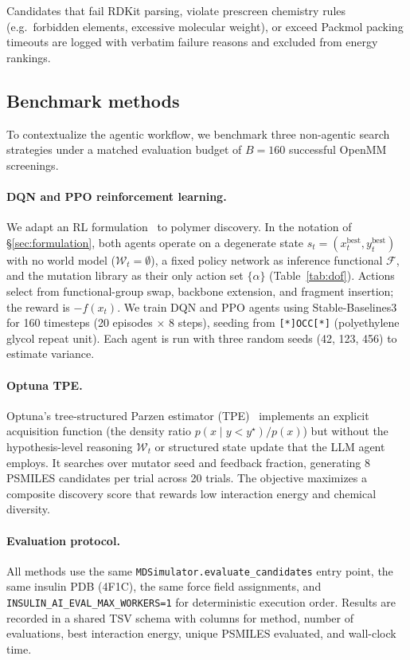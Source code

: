 \documentclass[twocolumn]{fairmeta}
\begin{document}
Candidates that fail RDKit parsing, violate prescreen chemistry rules (e.g.\ forbidden elements, excessive molecular weight), or exceed Packmol packing timeouts are logged with verbatim failure reasons and excluded from energy rankings.

\subsection{Benchmark methods}
\label{sec:benchmark_methods}

To contextualize the agentic workflow, we benchmark three non-agentic search strategies under a matched evaluation budget of $B{=}160$ successful OpenMM screenings.

\paragraph{DQN and PPO reinforcement learning.}
We adapt an RL formulation~\cite{boiko2023autonomous} to polymer discovery.
In the notation of \S\ref{sec:formulation}, both agents operate on a degenerate state $s_t = (x_t^\text{best}, y_t^\text{best})$ with no world model ($\mathcal{W}_t = \emptyset$), a fixed policy network as inference functional $\mathcal{F}$, and the mutation library as their only action set $\{\alpha\}$ (Table~\ref{tab:dof}).
Actions select from functional-group swap, backbone extension, and fragment insertion; the reward is $-f(x_t)$.
We train DQN and PPO agents using Stable-Baselines3~\cite{sb3_2021} for 160 timesteps (20 episodes $\times$ 8 steps), seeding from \texttt{[*]OCC[*]} (polyethylene glycol repeat unit).
Each agent is run with three random seeds (42, 123, 456) to estimate variance.

\paragraph{Optuna TPE.}
Optuna's tree-structured Parzen estimator (TPE)~\cite{optuna2019} implements an explicit acquisition function (the density ratio $p(x \mid y < y^\star) / p(x)$) but without the hypothesis-level reasoning $\mathcal{W}_t$ or structured state update that the LLM agent employs.
It searches over mutator seed and feedback fraction, generating 8 PSMILES candidates per trial across 20 trials.
The objective maximizes a composite discovery score that rewards low interaction energy and chemical diversity.

\paragraph{Evaluation protocol.}
All methods use the same \texttt{MDSimulator.evaluate\_candidates} entry point, the same insulin PDB (4F1C), the same force field assignments, and \texttt{INSULIN\_AI\_EVAL\_MAX\_WORKERS=1} for deterministic execution order.
Results are recorded in a shared TSV schema with columns for method, number of evaluations, best interaction energy, unique PSMILES evaluated, and wall-clock time.
\end{document}
